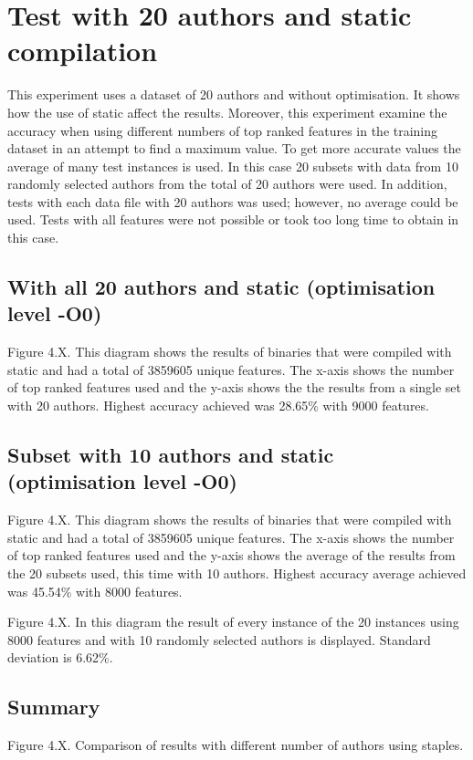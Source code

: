 \documentclass[a4paper,11pt]{kth-mag}
\begin{document}
\section{Test with 20 authors and static compilation}
This experiment uses a dataset of 20 authors and without  optimisation. It
shows how the use of static affect the results. Moreover, this experiment
examine the accuracy when using different numbers of top ranked features in the
training dataset in an attempt to find a maximum value.  To get more accurate
values the average of many test instances is used. In this case 20 subsets with
data from 10 randomly selected authors from the total of 20 authors were used.
In addition, tests with each data file with 20 authors was used; however, no
average could be used. Tests with all features were not possible or took too
long time to obtain in this case.   

\subsection{With all 20 authors and static (optimisation level -O0)}
Figure 4.X. This diagram shows the results of binaries that were compiled with
static and had a total of 3859605 unique features. The x-axis shows the number
of top ranked features used and the y-axis shows the the results from a single
set with 20 authors. Highest accuracy achieved was 28.65\% with 9000 features.

\subsection{Subset with 10 authors and static (optimisation level -O0)}
Figure 4.X. This diagram shows the results of binaries that were compiled with
static and had a total of 3859605 unique features. The x-axis shows the number
of top ranked features used and the y-axis shows the average of the results
from the 20 subsets used, this time with 10 authors. Highest accuracy average
achieved was 45.54\% with 8000 features.

Figure 4.X. In this diagram the result of every instance of the 20 instances
using 8000 features and with 10 randomly selected authors is displayed.
Standard deviation is 6.62\%.

\subsection{Summary}
Figure 4.X. Comparison of results with different number of authors using
staples.
\end{document}
